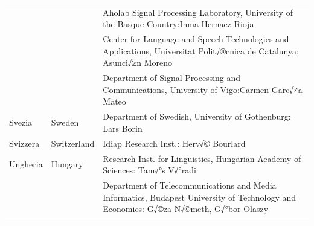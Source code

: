 \begin{longtable}{llp{110mm}}
  & & Aholab Signal Processing Laboratory, University of the Basque Country:\newline Inma Hernaez Rioja \\ \addlinespace 
  & & Center for Language and Speech Technologies and Applications, Universitat Polit√®cnica de Catalunya:  Asunci√≥n Moreno \\ \addlinespace 
  & & Department of Signal Processing and Communications, University of Vigo:\newline Carmen Garc√≠a Mateo \\ \addlinespace 
  Svezia & \textcolor{grey1}{Sweden} & Department of Swedish, University of Gothenburg: Lars Borin \\ \addlinespace 
  Svizzera & \textcolor{grey1}{Switzerland} & Idiap Research Inst.: Herv√© Bourlard \\ \addlinespace 
  Ungheria & \textcolor{grey1}{Hungary} & Research Inst. for Linguistics, Hungarian Academy of Sciences: Tam√°s V√°radi\\  \addlinespace
  & & Department of Telecommunications and Media Informatics, Budapest University of Technology and Economics: G√©za N√©meth, G√°bor Olaszy\\ \addlinespace

\end{longtable}
\normalsize

\renewcommand*{\figureformat}{}
\renewcommand*{\captionformat}{}

